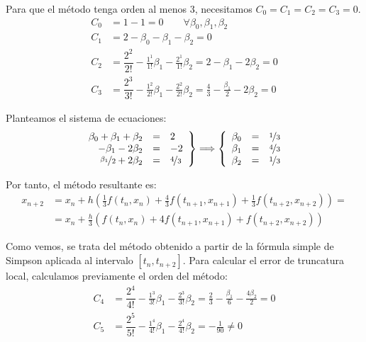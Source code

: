 \begin{ejercicio}
\begin{enumerate}
        Para que el método tenga orden al menos 3, necesitamos $C_0=C_1=C_2=C_3=0$.
        \begin{align*}
            C_0 &= 1 - 1 = 0\qquad \forall \beta_0, \beta_1, \beta_2 \\
            C_1 &= 2 - \beta_0 - \beta_1 - \beta_2 = 0\\
            C_2 &= \dfrac{2^2}{2!} - \frac{1^1}{1!}\beta_1 - \frac{2^1}{1!}\beta_2 = 2 - \beta_1 - 2\beta_2 = 0\\
            C_3 &= \dfrac{2^3}{3!} - \frac{1^2}{2!}\beta_1 - \frac{2^2}{2!}\beta_2 = \frac{4}{3} - \frac{\beta_1}{2} - 2\beta_2 = 0
        \end{align*}

        Planteamos el sistema de ecuaciones:
        \begin{equation*}
            \left.\begin{array}{rcl}
                \beta_0 + \beta_1 + \beta_2 & = & 2 \\
                -\beta_1 - 2\beta_2 & = & -2 \\
                \nicefrac{\beta_1}{2} + 2\beta_2 & = & \nicefrac{4}{3}
            \end{array}\right\}
            \Longrightarrow
            \left\{\begin{array}{rcl}
                \beta_0 & = & \nicefrac{1}{3} \\
                \beta_1 & = & \nicefrac{4}{3} \\
                \beta_2 & = & \nicefrac{1}{3}
            \end{array}\right.
        \end{equation*}

        Por tanto, el método resultante es:
        \begin{align*}
            x_{n+2} &= x_n + h \left( \frac{1}{3} f(t_n, x_n) + \frac{4}{3} f(t_{n+1}, x_{n+1}) + \frac{1}{3} f(t_{n+2}, x_{n+2}) \right)
            =\\&= x_n + \frac{h}{3} \left( f(t_n, x_n) + 4f(t_{n+1}, x_{n+1}) + f(t_{n+2}, x_{n+2}) \right)
        \end{align*}

        Como vemos, se trata del método obtenido a partir de la fórmula simple de Simpson aplicada al intervalo $[t_n, t_{n+2}]$. Para calcular el error de truncatura local, calculamos previamente el orden del método:
        \begin{align*}
            C_4 &= \dfrac{2^4}{4!} - \frac{1^3}{3!}\beta_1 - \frac{2^3}{3!}\beta_2 = \frac{2}{3} - \frac{\beta_1}{6} - \frac{4\beta_2}{2} = 0\\
            C_5 &= \dfrac{2^5}{5!} - \frac{1^4}{4!}\beta_1 - \frac{2^4}{4!}\beta_2 = -\frac{1}{90}\neq 0
        \end{align*}


\end{enumerate}
\end{ejercicio}
